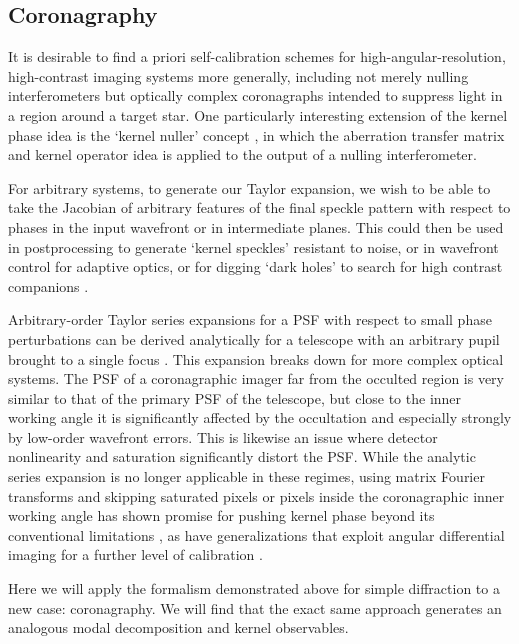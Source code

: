 \documentclass[modern]{aastex63}
\begin{document}
\subsection{Coronagraphy}
\label{sec:coronagraph}

It is desirable to find a priori self-calibration schemes for high-angular-resolution, high-contrast imaging systems more generally, including not merely nulling interferometers but optically complex coronagraphs intended to suppress light in a region around a target star. One particularly interesting extension of the kernel phase idea is the `kernel nuller' concept \citep{martinache18}, in which the aberration transfer matrix and kernel operator idea is applied to the output of a nulling interferometer. 

For arbitrary systems, to generate our Taylor expansion, we wish to be able to take the Jacobian of arbitrary features of the final speckle pattern with respect to phases in the input wavefront or in intermediate planes. This could then be used in postprocessing to generate `kernel speckles' resistant to noise, or in wavefront control for adaptive optics, or for digging `dark holes' to search for high contrast companions \citep{malbet95}.

Arbitrary-order Taylor series expansions for a PSF with respect to small phase perturbations can be derived analytically for a telescope with an arbitrary pupil brought to a single focus \citep{bloemhof01,anand02,perrin03}. This expansion breaks down for more complex optical systems. The PSF of a coronagraphic imager far from the occulted region is very similar to that of the primary PSF of the telescope, but close to the inner working angle it is significantly affected by the occultation and especially strongly by low-order wavefront errors. This is likewise an issue where detector nonlinearity and saturation significantly distort the PSF. While the analytic series expansion is no longer applicable in these regimes, using matrix Fourier transforms and skipping saturated pixels or pixels inside the coronagraphic inner working angle has shown promise for pushing kernel phase beyond its conventional limitations \citep{laugier19b}, as have generalizations that exploit angular differential imaging for a further level of calibration \citep{laugier20}.

Here we will apply the formalism demonstrated above for simple diffraction to a new case: coronagraphy. We will find that the exact same approach generates an analogous modal decomposition and kernel observables.
\end{document}
